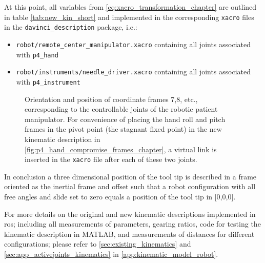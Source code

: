 At this point, all variables from \autoref{eq:xacro_transformation_chapter} are outlined in table \ref{tab:new_kin_short} and implemented in the corresponding \texttt{xacro} files in the \texttt{davinci\_description} package, i.e.:
\begin{itemize}
\item \texttt{robot/remote\_center\_manipulator.xacro} containing all joints associated with \texttt{p4\_hand}
\item \texttt{robot/instruments/needle\_driver.xacro} containing all joints associated with \texttt{p4\_instrument}
\end{itemize}
%
\begin{figure}[H]
\hspace*{-15mm}
\begin{minipage}{1.15\textwidth}
	\vspace*{5mm}
	\caption{Orientation and position of coordinate frames 7,8, etc., corresponding to the controllable joints of the robotic patient manipulator.  For convenience of placing the hand roll and pitch frames in the pivot point (the stagnant fixed point) in the new kinematic description in \autoref{fig:p4_hand_compromise_frames_chapter}, a virtual link is inserted in the \texttt{xacro} file after each of these two joints.}
	\label{fig:robot_hand_kinematics}
\end{minipage}
\end{figure}
In conclusion a three dimensional position of the tool tip is described in a frame oriented as the inertial frame and offset such that a robot configuration with all free angles and slide set to zero equals a position of the tool tip in [0,0,0].

For more details on the original and new kinematic descriptions implemented in \gls{ros}; including all measurements of parameters, gearing ratios, code for testing the kinematic description in MATLAB, and measurements of distances for different configurations; please refer to \autoref{sec:existing_kinematics} and \ref{sec:app_activejoints_kinematics} in \autoref{app:kinematic_model_robot}.










